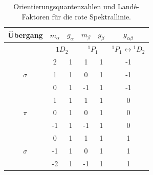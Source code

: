 \begin{table}
    \centering
    \begin{tabular}{c c c c c c}
        \toprule
        Übergang & $m_{\alpha}$ & $g_{\alpha}$ & $m_{\beta}$ & $g_{\beta}$ & $g_{\alpha \beta}$ \\
        \midrule
         &  \multicolumn{2}{c}{${}1D_2$}  &  \multicolumn{2}{c}{${}^1P_1$}  & ${}^1P_1\leftrightarrow{}^1D_2$ \\
         \midrule
        &   2   &   1   &   1   &   1   &   -1   \\
        $\sigma$  &  1  &   1   &   0   &   1   &   -1   \\
        &   0   &   1   &   -1  &   1   &   -1   \\
        \midrule
        &   1   &   1   &   1   &   1   &   0   \\
        $\pi$   &   0   &   1   &   0   &   1   &   0   \\
        &   -1   &   1   &  -1  &   1   &   0   \\
        \midrule
        &   0   &   1   &   1   &   1   &   1  \\
        $\sigma$    &   -1  &   1   &   0   &   1   &   1   \\
        &   -2  &   1   &   -1  &   1   &   1   \\
        \bottomrule
    \end{tabular}
    \caption{Orientierungsquantenzahlen und Landé- Faktoren für die rote Spektrallinie.}
    \label{tab1}
\end{table}
\FloatBarrier

